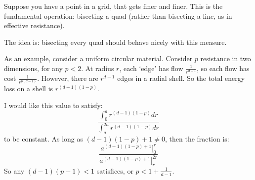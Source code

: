 Suppose you have a point in a grid, that gets finer and finer.
This is the fundamental operation: bisecting a quad (rather than
    bisecting a line, as in effective resistance).

The idea is: bisecting every quad should behave nicely with this
measure.

As an example, consider a uniform circular material. Consider $p$
resistance in two dimensions, for any $p < 2$.  At radius $r$,
each `edge' has flow $\frac{1}{r^{d-1}}$, so each flow has cost 
$\frac{1}{r^{p(d-1)}}$. However, there are $r^{d-1}$ edges in a radial
shell. So the total energy loss on a shell is $r^{(d-1)(1-p)}$.

I would like this value to satisfy: 
\[ \frac{\int_0^a r^{(d-1)(1-p)}dr}{\int_a^{2a} r^{(d-1)(1-p)} dr}\]
to be constant.  As long as $(d-1)(1-p)+1 \not= 0$, then the
fraction is:
\[ \frac{a^{(d-1)(1-p)+1}]_0^r}{a^{(d-1)(1-p)+1}]_{r}^{2r}}\]
So any $(d-1)(p-1) < 1$ satisfices, or $p < 1+\frac{1}{d-1}$.

